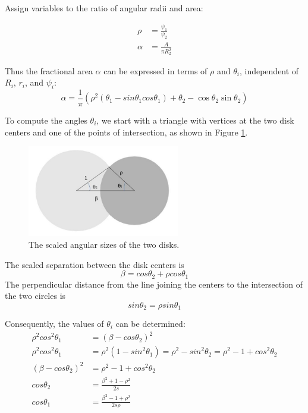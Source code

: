    Assign variables to the ratio of angular radii and area:

   \begin{align*}
   \rho &= \frac{\psi_1}{\psi_2} \\
   \alpha &= \frac{A}{\pi R_2^2}
   \end{align*}

   Thus the fractional area $\alpha$ can be expressed in terms of $\rho$ and
   $\theta_i$, independent of $R_i$, $r_i$, and $\psi_i$:
   \begin{equation*}
    \alpha = \frac{1}{\pi} \left( \rho^2(\theta_1 - sin \theta_1 cos\theta_1) +
             \theta_{2}-\cos \theta _{2}\sin \theta _{2} \right)
   \end{equation*}

   To compute the angles $\theta_i$, we start with a triangle with vertices at
   the two disk centers and one of the points of intersection, as shown in Figure
   \ref{fig:shadow_calc_triangle}.

   \begin{figure}[!ht]
   \begin{center}
    \includegraphics[height=40mm]{figs/shadow/shadow_calculator_fig6.jpg}
    \end{center}
    \caption{The scaled angular sizes of the two disks.}
    \label{fig:shadow_calc_triangle}
   \end{figure}





   The scaled separation between the disk centers is
   \begin{equation*}
     \beta = cos \theta_2 + \rho cos \theta_1
   \end{equation*}
   The perpendicular distance from the line joining the
   centers to the intersection of the two circles is
   \begin{equation*}
     sin \theta_2 = \rho sin \theta_1
   \end{equation*}

   Consequently, the values of $\theta_i$ can be determined:
   \begin{align*}
     \rho^2 cos^2 \theta_1 &= (\beta - cos \theta_2)^2 \\
     \rho^2 cos^2 \theta_1 &= \rho^2 (1 - sin^2 \theta_1) =
                               \rho^2 - sin^2 \theta_2 =
                               \rho^2 -1 + cos^2 \theta_2 \\
     (\beta - cos \theta_2)^2 &= \rho^2 -1 + cos^2 \theta_2  \\
     cos \theta_2 &= \frac{\beta^2 + 1 - \rho^2}{2s} \\
     cos \theta_1 &= \frac{\beta^2 - 1 + \rho^2}{2s \rho}
   \end{align*}

